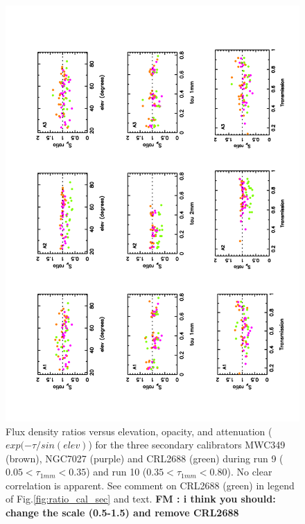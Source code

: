 \begin{figure}[p]
\begin{center}
  \includegraphics[clip, angle=-90, scale=0.6]{Figures/Ratio_vs_elev_op_sec_r9_r10.pdf}
  \caption{Flux density ratios versus elevation, opacity, and attenuation ($exp(-\tau/sin(elev)$) for the three secondary
    calibrators  MWC349 (brown), NGC7027 (purple)  and CRL2688 (green) during run 9 ($0.05  < \tau_{1mm} < 0.35$)
    and run 10 ($0.35  < \tau_{1mm} < 0.80$). No clear  correlation is apparent. 
    See comment on CRL2688 (green) in legend of Fig.\ref{fig:ratio_cal_sec} and text. {\bf FM : i think you should: change the scale
    (0.5-1.5) and remove CRL2688}}
\label{fig:corr_cal_sec}
\end{center}
\end{figure}

















